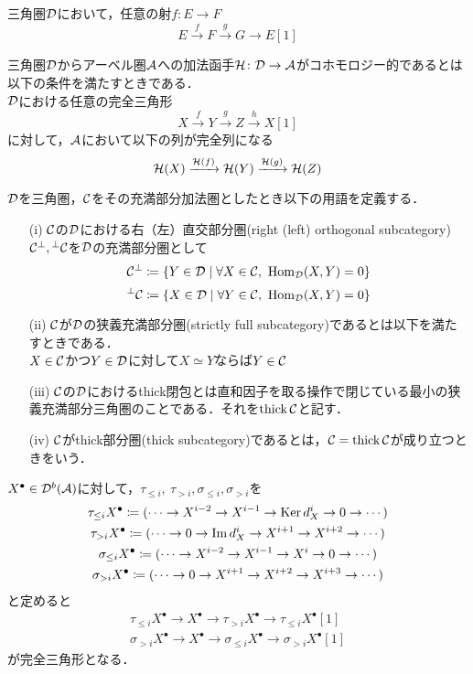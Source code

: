 \begin{lemm}
	三角圏${\mathcal D}$において，任意の射$f\colon E\rightarrow F$
	\[E\xrightarrow{f} F\xrightarrow{g} G\rightarrow E[1]\]
\end{lemm}

\begin{defn}
	三角圏${\mathcal D}$からアーベル圏${\mathcal A}$への加法函手${\mathcal H}\colon {\mathcal D}\to{\mathcal A}$がコホモロジー的であるとは以下の条件を満たすときである．\\
	${\mathcal D}$における任意の完全三角形
	\[X\xrightarrow{f}Y\xrightarrow{g}Z\xrightarrow{h}X[1]\]
	に対して，${\mathcal A}$において以下の列が完全列になる
	\[{\mathcal H}(X)\xrightarrow{{\mathcal H}(f)}{\mathcal H}(Y)\xrightarrow{{\mathcal H}(g)}{\mathcal H}(Z)\]
\end{defn}

\begin{defn}
	${\mathcal D}$を三角圏，${\mathcal C}$をその充満部分加法圏としたとき以下の用語を定義する．
	\begin{itemize}
		\item[(i)]
			${\mathcal C}$の${\mathcal D}$における右（左）直交部分圏(right (left) orthogonal subcategory) ${\mathcal C}^\perp,{}^\perp{\mathcal C}$を${\mathcal D}$の充満部分圏として
			\[\C^\perp\coloneq \{Y\in\D\mid\forall X\in\C,\ \Hom_{\D}(X,Y)=0\}\]
			\[{}^\perp\C\coloneq \{X\in\D\mid\forall Y\in\C,\ \Hom_{\D}(X,Y)=0\}\]
		\item[(ii)]
			${\mathcal C}$が${\mathcal D}$の狭義充満部分圏(strictly full subcategory)であるとは以下を満たすときである．\\
			$X\in{\mathcal C}$かつ$Y\in{\mathcal D}$に対して$X\simeq Y$ならば$Y\in{\mathcal C}$
		\item[(iii)]
			${\mathcal C}$の${\mathcal D}$におけるthick閉包とは直和因子を取る操作で閉じている最小の狭義充満部分三角圏のことである．それを$\operatorname{\mathrm{thick}} {\mathcal C}$と記す．
		\item[(iv)]
			${\mathcal C}$がthick部分圏(thick subcategory)であるとは，${\mathcal C} = \operatorname{\mathrm{thick}}{\mathcal C}$が成り立つときをいう．
	\end{itemize}

\end{defn}
$X^\bullet\in{\mathcal D}^b({\mathcal A})$に対して，$\tau_{\le i},\ \tau_{> i},\sigma_{\le i}, \sigma_{> i}$を
\begin{gather*}
	\tau_{\le i}X^\bullet\coloneq (\cdots \rightarrow X^{i-2}\rightarrow X^{i-1}\rightarrow \operatorname{Ker} d_X^i\rightarrow 0\rightarrow \cdots)\\
	\tau_{> i}X^\bullet\coloneq (\cdots \rightarrow 0\rightarrow \Im d_X^i\rightarrow X^{i+1}\rightarrow X^{i+2}\rightarrow \cdots)\\
	\sigma_{\le i}X^\bullet\coloneq (\cdots \rightarrow X^{i-2}\rightarrow X^{i-1}\rightarrow X^i\rightarrow 0\rightarrow \cdots)\\
	\sigma_{> i}X^\bullet\coloneq (\cdots \rightarrow 0\rightarrow X^{i+1}\rightarrow X^{i+2}\rightarrow X^{i+3}\rightarrow \cdots)
\end{gather*}
と定めると
\begin{gather}
	\tau_{\le i}X^\bullet\rightarrow X^\bullet \rightarrow\tau_{>i}X^\bullet\rightarrow \tau_{\le i}X^\bullet[1]\label{canonical}\\
	\sigma_{>i}X^\bullet\rightarrow X^\bullet \rightarrow\sigma_{\le i}X^\bullet\rightarrow \sigma_{> i}X^\bullet[1]\label{stupid}
\end{gather}
が完全三角形となる．


